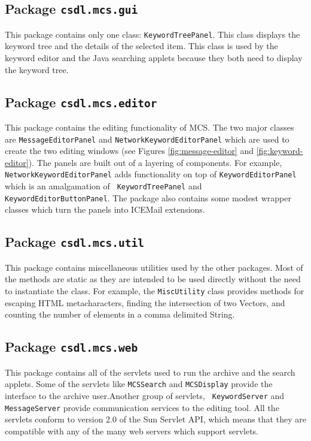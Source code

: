 \subsection{Package {\tt csdl.mcs.gui}}
This package contains only one class: {\tt KeywordTreePanel}. This class
displays the keyword tree and the details of the selected item. This class is
used by the keyword editor and the Java searching applets because they both
need to display the keyword tree.

\subsection{Package {\tt csdl.mcs.editor}}
This package contains the editing functionality of MCS. The two major classes
are {\tt MessageEditorPanel} and {\tt NetworkKeywordEditorPanel} which are used
to create the two editing windows (see Figures \ref{fig:message-editor} and
\ref{fig:keyword-editor}). The panels are built out of a layering of
components. For example, {\tt NetworkKeywordEditorPanel} adds functionality on
top of {\tt KeywordEditorPanel} which is an amalgamation of {\tt
KeywordTreePanel} and {\tt KeywordEditorButtonPanel}. The package also
contains some modest wrapper classes which turn the panels into ICEMail
extensions.

\subsection{Package {\tt csdl.mcs.util}}
This package contains miscellaneous utilities used by the other packages. Most
of the methods are static as they are intended to be used directly without the
need to instantiate the class. For example, the {\tt MiscUtility} class
provides methods for escaping HTML metacharacters, finding the intersection of
two Vectors, and counting the number of elements in a comma delimited String.

\subsection{Package {\tt csdl.mcs.web}}
This package contains all of the servlets used to run the archive and the
search applets. Some of the servlets like {\tt MCSSearch} and {\tt MCSDisplay}
provide the interface to the archive user.Another group of servlets, {\tt
  KeywordServer} and {\tt MessageServer} provide communication services to the
editing tool. All the servlets conform to version 2.0 of the Sun Servlet API,
which means that they are compatible with any of the many web servers which
support servlets.

